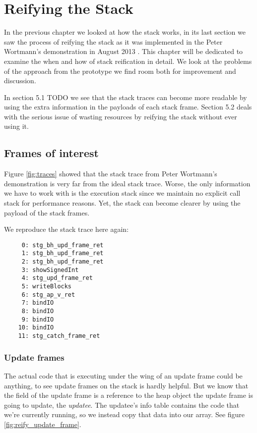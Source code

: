 \chapter{Reifying the Stack}

In the previous chapter we looked at how the stack works, in its
last section we saw the process of reifying the stack as it was
implemented in the Peter Wortmann's demonstration in August 2013
\cite{stack_traces_ticket}. This chapter will be dedicated to examine
the when and how of stack reification in detail. We look at the problems
of the approach from the prototype we find room both for improvement and
discussion.

In section 5.1 TODO we see that the stack traces can become more
readable by using the extra information in the payloads of each stack
frame. Section 5.2 deals with the serious issue of wasting resources by
reifying the stack without ever using it.

\section{Frames of interest}

Figure \ref{fig:traces} showed that the stack trace from Peter Wortmann's
demonstration is very far from the ideal stack trace.  Worse, the only
information we have to work with is the execution stack since we maintain no
explicit call stack for performance reasons. Yet, the stack can become
clearer by using the payload of the stack frames.

We reproduce the stack trace here again:

\begin{verbatim}
     0: stg_bh_upd_frame_ret
     1: stg_bh_upd_frame_ret
     2: stg_bh_upd_frame_ret
     3: showSignedInt
     4: stg_upd_frame_ret
     5: writeBlocks
     6: stg_ap_v_ret
     7: bindIO
     8: bindIO
     9: bindIO
    10: bindIO
    11: stg_catch_frame_ret
\end{verbatim}


\subsection{Update frames}

The actual code that is executing under the wing of an update frame
could be anything, to see update frames on the stack is hardly helpful.
But we know that the field of the update frame is a reference to the
heap object the update frame is going to update, the \emph{updatee}. The updatee's
info table contains the code that we're currently running, so we instead
copy that data into our array. See figure \ref{fig:reify_update_frame}.

